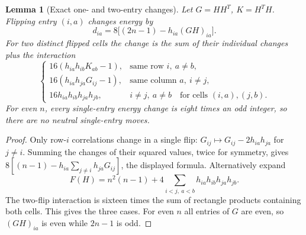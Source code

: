 \documentclass[11pt]{article}
\newtheorem{lemma}[theorem]{Lemma}
\begin{document}
\begin{lemma}[Exact one- and two-entry changes]\label{lem:spectral-flip-calculus}
Let $G=HH^T$, $K=H^TH$. Flipping entry $(i,a)$ changes energy by
\[
 d_{ia}=8\big[(2n-1)-h_{ia}(GH)_{ia}\big].
\]
For two distinct flipped cells the change is the sum of their individual
changes plus the interaction
\[
 \begin{cases}
 16(h_{ia}h_{ib}K_{ab}-1),&\text{same row }i,\ a\ne b,\\
 16(h_{ia}h_{ja}G_{ij}-1),&\text{same column }a,\ i\ne j,\\
 16h_{ia}h_{ib}h_{ja}h_{jb},&i\ne j,\ a\ne b
 \quad\text{for cells }(i,a),(j,b).
 \end{cases}
\]
For even $n$, every single-entry energy change is eight times an odd
integer, so there are no neutral single-entry moves.
\end{lemma}
\begin{proof}
Only row-$i$ correlations change in a single flip:
$G_{ij}\mapsto G_{ij}-2h_{ia}h_{ja}$ for $j\ne i$.
Summing the changes of their squared values, twice for symmetry, gives
$8[(n-1)-h_{ia}\sum_{j\ne i}h_{ja}G_{ij}]$, the displayed formula.
Alternatively expand
\[
 F(H)=n^2(n-1)+4\sum_{i<j,\ a<b}h_{ia}h_{ib}h_{ja}h_{jb}.
\]
The two-flip interaction is sixteen times the sum of rectangle products
containing both cells. This gives the three cases. For even $n$ all
entries of $G$ are even, so $(GH)_{ia}$ is even while $2n-1$ is odd.
\end{proof}
\end{document}
